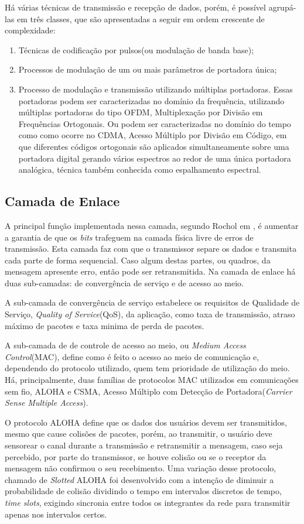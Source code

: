 Há várias técnicas de transmissão e recepção de dados, porém, é possível agrupá-las em três classes, que são apresentadas a seguir em ordem crescente de complexidade:
\begin{enumerate}
	\item Técnicas de codificação por pulsos(ou modulação de banda base);
	\item Processos de modulação de um ou mais parâmetros de portadora única;
	\item Processo de modulação e transmissão utilizando múltiplas portadoras. Essas portadoras podem ser caracterizadas no domínio da frequência, utilizando múltiplas portadoras do tipo OFDM, Multiplexação por Divisão em Frequências Ortogonais. Ou podem ser caracterizadas no domínio do tempo como como ocorre no CDMA, Acesso Múltiplo por Divisão em Código, em que diferentes códigos ortogonais são aplicados simultaneamente sobre uma portadora digital gerando vários espectros ao redor de uma única portadora analógica, técnica também conhecida como espalhamento espectral.
\end{enumerate}

\subsection{Camada de Enlace}
A principal função implementada nessa camada, segundo Rochol em \cite{rochol2018sistemas}, é aumentar a garantia de que os \emph{bits} trafeguem na camada física livre de erros de transmissão. Esta camada faz com que o transmissor separe os dados e transmita cada parte de forma sequencial. Caso algum destas partes, ou quadros, da mensagem apresente erro, então pode ser retransmitida. Na camada de enlace há duas sub-camadas: de convergência de serviço e de acesso ao meio.

A sub-camada de convergência de serviço estabelece os requisitos de Qualidade de Serviço, \emph{Quality of Service}(QoS), da aplicação, como taxa de transmissão, atraso máximo de pacotes e taxa minima de perda de pacotes.

A sub-camada de de controle de acesso ao meio, ou \emph{Medium Access Control}(MAC), define como é feito o acesso ao meio de comunicação e, dependendo do protocolo utilizado, quem tem prioridade de utilização do meio. Há, principalmente, duas famílias de protocolos MAC utilizados em comunicações sem fio, ALOHA e CSMA, Acesso Múltiplo com Detecção de Portadora(\emph{Carrier Sense Multiple Access}).

O protocolo ALOHA define que os dados dos usuários devem ser transmitidos, mesmo que cause colisões de pacotes, porém, ao transmitir, o usuário deve sensorear o canal durante a transmissão e retransmitir a mensagem, caso seja percebido, por parte do transmissor, se houve colisão ou se o receptor da mensagem não confirmou o seu recebimento. Uma variação desse protocolo, chamado de \emph{Slotted} ALOHA foi desenvolvido com a intenção de diminuir a probabilidade de colisão dividindo o tempo em intervalos discretos de tempo, \emph{time slots}, exigindo sincronia entre todos os integrantes da rede para transmitir apenas nos intervalos certos.

